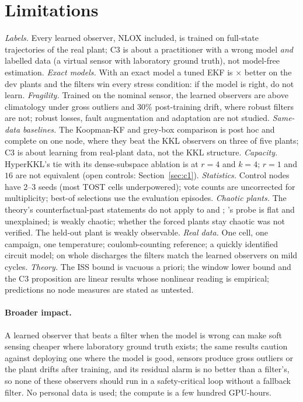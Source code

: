 \section{Limitations}\label{sec:limitations}

\emph{Labels.} Every learned observer, NLOX included, is trained on full-state trajectories of the real plant; C3 is about a practitioner with a wrong model \emph{and} labelled data (a virtual sensor with laboratory ground truth), not model-free estimation. \emph{Exact models.} With an exact model a tuned EKF is \ConeLearnedOverEkfMedianSeq$\times$ better on the dev plants and the filters win every stress condition: if the model is right, do not learn. \emph{Fragility.} Trained on the nominal sensor, the learned observers are above climatology under gross outliers and 30\% post-training drift, where robust filters are not; robust losses, fault augmentation and adaptation are not studied. \emph{Same-data baselines.} The Koopman-KF and grey-box comparison is post hoc and complete on one node, where they beat the KKL observers on three of five plants; C3 is about learning from real-plant data, not the KKL structure. \emph{Capacity.} HyperKKL's tie with its dense-subspace ablation is at $r=4$ and $k=4$; $r=1$ and $16$ are not equivalent (open controls: Section~\ref{sec:c1}). \emph{Statistics.} Control nodes have 2--3 seeds (most TOST cells underpowered); vote counts are uncorrected for multiplicity; best-of selections use the evaluation episodes. \emph{Chaotic plants.} The theory's counterfactual-past statements do not apply to  and ; 's probe is flat and unexplained;  is weakly chaotic; whether the forced plants stay chaotic was not verified. The held-out  plant is weakly observable. \emph{Real data.} One cell, one campaign, one temperature; coulomb-counting reference; a quickly identified circuit model; on whole discharges the filters match the learned observers on mild cycles. \emph{Theory.} The ISS bound is vacuous a priori; the window lower bound and the C3 proposition are linear results whose nonlinear reading is empirical; predictions no node measures are stated as untested.

\paragraph{Broader impact.} A learned observer that beats a filter when the model is wrong can make soft sensing cheaper where laboratory ground truth exists; the same results caution against deploying one where the model is good, sensors produce gross outliers or the plant drifts after training, and its residual alarm is no better than a filter's, so none of these observers should run in a safety-critical loop without a fallback filter. No personal data is used; the compute is a few hundred GPU-hours.
